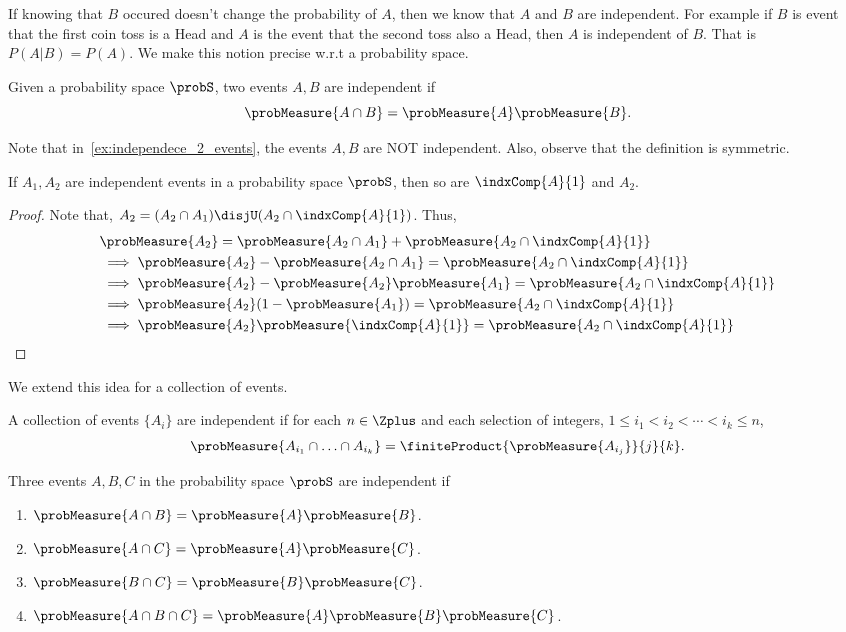 If knowing that $B$ occured doesn't change the probability of $A$, then we know that $A$ and $B$ are
independent. For example if $B$ is event that the first coin toss is a Head and $A$ is the event that the
second toss also a Head, then $A$ is independent of $B$. That is $P(A | B) = P(A)$.
We make this notion precise w.r.t a probability space.
\begin{Definition}[name=Independence of events]
    Given a probability space $\probS$, two events $A,B$ are independent if
    \[\probMeasure{A\cap B} = \probMeasure{A}\probMeasure{B}.\]
\end{Definition}
Note that in~\ref{ex:independece_2_events}, the events $A,B$ are NOT independent. Also, observe that the 
definition is symmetric.  
\begin{Proposition}
    If $A_1,A_2$ are independent events in a probability space $\probS$, then so are $\indxComp{A}{1}$ and
    $A_2$.
\end{Proposition}
\begin{proof}
    Note that, $A_2 = (A_2\cap A_1) \disjU (A_2 \cap \indxComp{A}{1})$. Thus,
    \begin{align*}
	&\probMeasure{A_2} = \probMeasure{A_2\cap A_1} + \probMeasure{A_2 \cap \indxComp{A}{1}} \\
	&\implies \probMeasure{A_2} - \probMeasure{A_2\cap A_1} = \probMeasure{A_2 \cap \indxComp{A}{1}} \\
	&\implies \probMeasure{A_2} - \probMeasure{A_2}\probMeasure{A_1} = 
	\probMeasure{A_2 \cap \indxComp{A}{1}} \\
	&\implies \probMeasure{A_2}(1 - \probMeasure{A_1}) = \probMeasure{A_2 \cap \indxComp{A}{1}} \\
	&\implies \probMeasure{A_2}\probMeasure{\indxComp{A}{1}} = \probMeasure{A_2 \cap \indxComp{A}{1}}
    \end{align*}
\end{proof}
We extend this idea for a collection of events.
\begin{Definition}[name=Independence of a collection of events]
    A collection of events $\lbrace A_i \rbrace$ are independent if for each $n\in\Zplus$ and each selection
    of integers, $1\leq i_1 < i_2 < \cdots < i_k\leq n$,
    \[\probMeasure{A_{i_1}\cap\ldots\cap A_{i_k}} = \finiteProduct{\probMeasure{A_{i_j}}}{j}{k}.\]
\end{Definition}
\begin{Example}
    Three events $A,B,C$ in the probability space $\probS$ are independent if
    \begin{enumerate}
	\item
	    $\probMeasure{A\cap B} = \probMeasure{A}\probMeasure{B}$.
	\item
	    $\probMeasure{A\cap C} = \probMeasure{A}\probMeasure{C}$.
	\item
	    $\probMeasure{B\cap C} = \probMeasure{B}\probMeasure{C}$.
	\item
	    $\probMeasure{A\cap B\cap C} = \probMeasure{A}\probMeasure{B}\probMeasure{C}$.
    \end{enumerate}
\end{Example}
